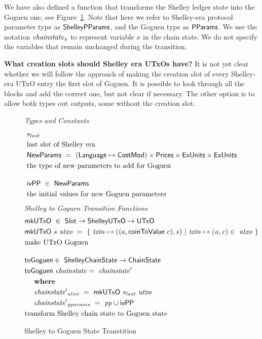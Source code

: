 We have also defined a function that transforms the Shelley ledger state into
the Goguen one, see Figure~\ref{fig:functions:to-shelley}. Note that here we
refer to Shelley-era protocol parameter type as $\mathsf{ShelleyPParams}$, and the Goguen
type as $\mathsf{PParams}$. We use the notation $\mathit{chainstate}_{x}$ to represent
variable $x$ in the chain state. We do not specify the variables that
remain unchanged during the transition.

\begin{note}
  \textbf{What creation slots should Shelley era UTxOs have?}
  It is not yet clear whether we will follow the approach of making the creation
  slot of every Shelley-era UTxO entry the first slot of Goguen. It is possible
  to look through all the blocks and add the correct one, but not clear if
  necessary. The other option is to allow both types out outputs, some without
  the creation slot.
\end{note}

\begin{figure}[htb]
  \emph{Types and Constants}
  \begin{align*}
      & s_{last} \\
      & \text{last slot of Shelley era} \\
      & \NewParams ~=~ (\Language \mapsto \CostMod) \times \Prices \times \ExUnits \times \ExUnits \\
      & \text{the type of new parameters to add for Goguen}
      \nextdef
      & \mathsf{ivPP} ~\in~ \NewParams \\
      & \text{the initial values for new Goguen parameters}
  \end{align*}
  \emph{Shelley to Goguen Transition Functions}
  \begin{align*}
      & \fun{mkUTxO} ~\in~ \Slot \to \ShelleyUTxO  \to \UTxO  \\
      & \fun{mkUTxO}~s~\var{utxo} ~=~ \{~ \var{txin} \mapsto ((a,\fun{coinToValue}~c),s) ~\vert~
      \var{txin} \mapsto \var{(a,c)}\in ~\var{utxo}~\} \\
      & \text{make UTxO Goguen}
      \nextdef
      & \fun{toGoguen} \in ~ \ShelleyChainState \to \ChainState \\
      & \fun{toGoguen}~\var{chainstate} =~\var{chainstate'} \\
      &~~\where \\
      &~~~~\var{chainstate'}_{utxo}~=~\fun{mkUTxO}~s_{last}~\var{utxo} \\
      &~~~~\var{chainstate'}_{pparams}~=~\var{pp}\cup \mathsf{ivPP}\\
      & \text{transform Shelley chain state to Goguen state}
  \end{align*}
  \caption{Shelley to Goguen State Transtition}
  \label{fig:functions:to-shelley}
\end{figure}

